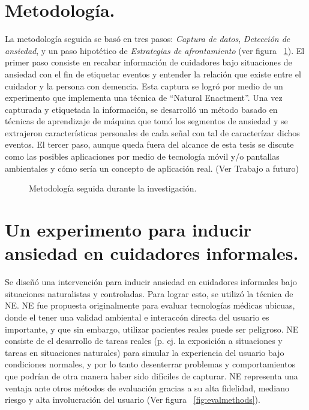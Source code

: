 \section{Metodolog\'ia.}\label{secc:methodology}
La metodolog\'ia seguida se bas\'o en tres pasos: \textit{Captura de datos}, \textit{Detecci\'on de ansiedad}, y un paso hipot\'etico de \textit{Estrategias de afrontamiento} (ver figura ~\ref{fig:metodology}). El primer paso consiste en recabar informaci\'on de cuidadores bajo situaciones de ansiedad con el fin de etiquetar eventos y entender la relaci\'on que existe entre el cuidador y la persona con demencia. Esta captura se logr\'o por medio de un experimento que implementa una t\'ecnica de ``Natural Enactment''. Una vez capturada y etiquetada la informaci\'on, se desarroll\'o un m\'etodo basado en t\'ecnicas de aprendizaje de m\'aquina que tom\'o los segmentos de ansiedad y se extrajeron caracter\'isticas personales de cada se\~nal con tal de caracter\'izar dichos eventos. El tercer paso, aunque queda fuera del alcance de esta tesis se discute como las posibles aplicaciones por medio de tecnolog\'ia m\'ovil y/o pantallas ambientales y c\'omo ser\'ia un concepto de aplicaci\'on real. (Ver Trabajo a futuro)
\begin{figure}[h]
        \centering
        \caption{Metodolog\'ia seguida durante la investigaci\'on.} \label{fig:metodology}
\end{figure}

\section{Un experimento para inducir ansiedad en cuidadores informales.}\label{secc:experiment}
Se dise\~n\'o una intervenci\'on para inducir ansiedad en cuidadores informales bajo situaciones naturalistas y controladas. Para lograr esto, se utiliz\'o la t\'ecnica de NE. NE fue propuesta originalmente para evaluar tecnolog\'ias m\'edicas ubicuas, donde el tener una validad ambiental e interacc\'on directa del usuario es importante, y que sin embargo, utilizar pacientes reales puede ser peligroso\citep{Castro11}. NE consiste de el desarrollo de tareas reales (p. ej. la exposici\'on a situaciones y tareas en situaciones naturales) para simular la experiencia del usuario bajo condiciones normales, y por lo tanto desenterrar problemas y comportamientos que podr\'ian de otra manera haber sido dif\'iciles de capturar. NE representa una ventaja ante otros m\'etodos de evaluaci\'on gracias a su alta fidelidad, mediano riesgo y alta involucraci\'on del usuario (Ver figura ~\ref{fig:evalmethods}).

